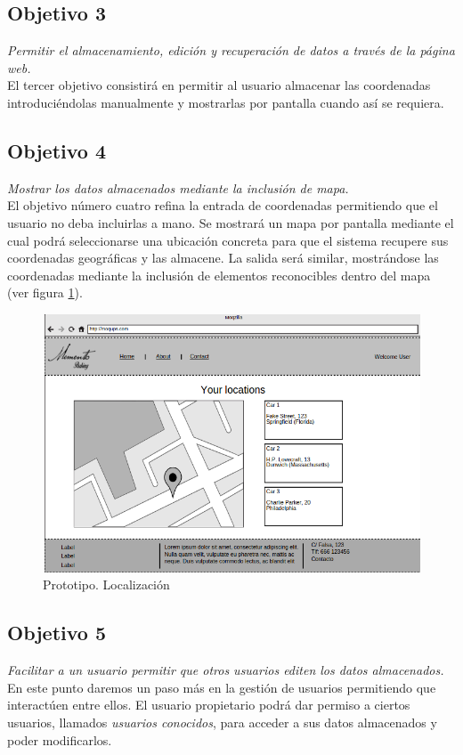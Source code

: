 \subsection{Objetivo 3}
\emph{Permitir el almacenamiento, edición y recuperación de datos a través de la página web.}\\
El tercer objetivo consistirá en permitir al usuario almacenar las coordenadas introduciéndolas manualmente y mostrarlas por pantalla cuando así se requiera.

\subsection{Objetivo 4}
\emph{Mostrar los datos almacenados mediante la inclusión de mapa.}\\
El objetivo número cuatro refina la entrada de coordenadas permitiendo que el usuario no deba incluirlas a mano. Se mostrará un mapa por pantalla mediante el cual podrá seleccionarse una ubicación concreta para que el sistema recupere sus coordenadas geográficas y las almacene. La salida será similar, mostrándose las coordenadas mediante la inclusión de elementos reconocibles dentro del mapa (ver figura \ref{fig:prototipo_locations}).

\begin{figure}[h!btp]
	\centering
	\includegraphics[scale=0.5, fbox={\fboxrule} 4mm]{images/02-objetivos/04-prototipo_locations.png}
	\caption{Prototipo. Localización}
	\label{fig:prototipo_locations}
\end{figure}


\subsection{Objetivo 5}
\emph{Facilitar a un usuario permitir que otros usuarios editen los datos almacenados.}\\
En este punto daremos un paso más en la gestión de usuarios permitiendo que interactúen entre ellos. El usuario propietario podrá dar permiso a ciertos usuarios, llamados \textit{usuarios conocidos}, para acceder a sus datos almacenados y poder modificarlos.


